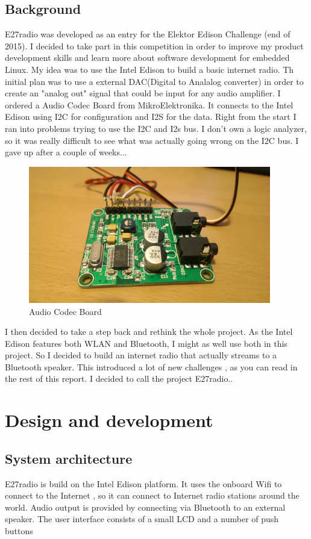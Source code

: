 \documentclass[12pt,a4paper]{scrreprt}
\begin{document}
\section{Background}
E27radio was developed as an entry for the Elektor Edison Challenge (end of 2015). I decided to take part in this competition in order to improve my product development skills and learn more about software development for embedded Linux.
My idea was to use the Intel Edison to build a basic internet radio.
Th initial plan was to use a external DAC(Digital to Analalog converter) in order to create an "analog out" signal that could be input for any audio amplifier.
I ordered a Audio Codec Board from MikroElektronika. It connects to the Intel Edison using I2C for configuration and I2S for the data. 
Right from the start I ran into problems trying to use the I2C and I2s bus.
I don't own a logic analyzer, so it was really difficult to see what was actually going wrong on the I2C bus. I gave up after a couple of weeks...

\begin{figure}[h]
	\includegraphics[width=400px]{images/audio1}
	\caption{Audio Codec Board}
\end{figure}

I then decided to take a step back and rethink the whole project.
As the Intel Edison features both WLAN and Bluetooth, I might as well use both in this project. 
So I decided to build an internet radio that actually streams to a Bluetooth speaker. This introduced a lot of new challenges , as you can read in the rest of this report. I decided to call the project E27radio..


\chapter{Design and development}


\section{System architecture}
E27radio is build on the Intel Edison platform.
It uses the onboard Wifi to connect to the Internet , so it can connect to Internet radio stations around the world. Audio output is provided by connecting via Bluetooth to an external speaker.
The user interface consists of a small LCD and a number of push buttons
\end{document}
